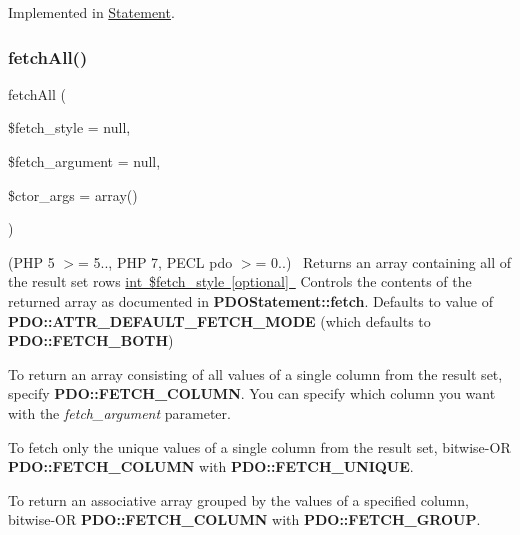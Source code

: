 Implemented in \mbox{\hyperlink{class_pes_1_1_database_1_1_statement_1_1_statement_a5b20a3b5483f33168970c1ff76758042}{Statement}}.

\mbox{\label{interface_pes_1_1_database_1_1_statement_1_1_p_d_o_statement_interface_a5721d6df319aed83538605d4c6486947}} 
\subsubsection{\texorpdfstring{fetch\+All()}{fetchAll()}}
{\footnotesize\ttfamily fetch\+All (\begin{DoxyParamCaption}\item[{}]{\$fetch\+\_\+style = {\ttfamily null},  }\item[{}]{\$fetch\+\_\+argument = {\ttfamily null},  }\item[{}]{\$ctor\+\_\+args = {\ttfamily array()} }\end{DoxyParamCaption})}

(P\+HP 5 $>$= 5.., P\+HP 7, P\+E\+CL pdo $>$= 0..)~\newline
 Returns an array containing all of the result set rows \mbox{\hyperlink{}{int \$fetch\+\_\+style \mbox{[}optional\mbox{]} }} Controls the contents of the returned array as documented in {\bfseries P\+D\+O\+Statement\+::fetch}. Defaults to value of {\bfseries P\+D\+O\+::\+A\+T\+T\+R\+\_\+\+D\+E\+F\+A\+U\+L\+T\+\_\+\+F\+E\+T\+C\+H\+\_\+\+M\+O\+DE} (which defaults to {\bfseries P\+D\+O\+::\+F\+E\+T\+C\+H\+\_\+\+B\+O\+TH}) 

To return an array consisting of all values of a single column from the result set, specify {\bfseries P\+D\+O\+::\+F\+E\+T\+C\+H\+\_\+\+C\+O\+L\+U\+MN}. You can specify which column you want with the {\itshape fetch\+\_\+argument} parameter. 

To fetch only the unique values of a single column from the result set, bitwise-\/\+OR {\bfseries P\+D\+O\+::\+F\+E\+T\+C\+H\+\_\+\+C\+O\+L\+U\+MN} with {\bfseries P\+D\+O\+::\+F\+E\+T\+C\+H\+\_\+\+U\+N\+I\+Q\+UE}. 

To return an associative array grouped by the values of a specified column, bitwise-\/\+OR {\bfseries P\+D\+O\+::\+F\+E\+T\+C\+H\+\_\+\+C\+O\+L\+U\+MN} with {\bfseries P\+D\+O\+::\+F\+E\+T\+C\+H\+\_\+\+G\+R\+O\+UP}. 



